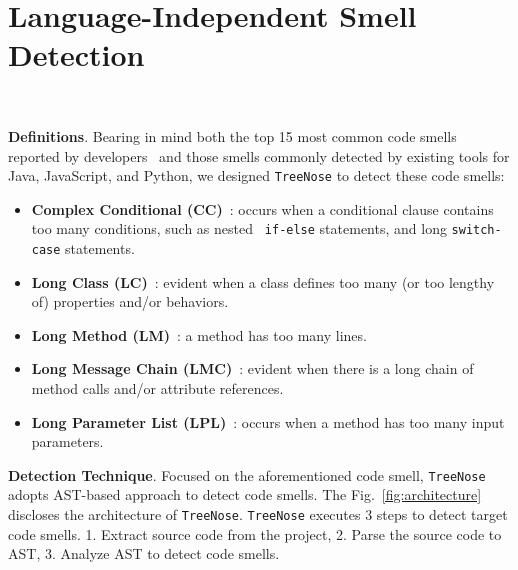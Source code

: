 


\vspace*{-0.5em}

\section{Language-Independent Smell Detection}~\label{sec:approach}

\vspace*{-1em}


{\bf Definitions}. Bearing in mind both the top 15 most common code smells
reported by developers~\cite{developersCare} and those smells commonly detected
by existing tools for Java, JavaScript, and Python, we designed
\texttt{TreeNose} to detect these code smells:

\begin{itemize}[leftmargin=*]
	\item \textbf{Complex Conditional (CC)}~\cite{Fowler_Beck}: occurs when a
	      conditional clause contains too many conditions, such as nested {\tt
			      if-else} statements, and long {\tt switch-case} statements.
	\item \textbf{Long Class (LC)}~\cite{Fowler_Beck}: evident when a class
	      defines too many (or too lengthy of) properties and/or behaviors.
	\item \textbf{Long Method (LM)}~\cite{Fowler_Beck}: a method has too many
	      lines.
	\item \textbf{Long Message Chain (LMC)}~\cite{Fowler_Beck}: evident when
	      there is a long chain of method calls and/or attribute references.
	\item \textbf{Long Parameter List (LPL)}~\cite{Fowler_Beck}: occurs when a
	      method has too many input parameters.
\end{itemize}


{\bf Detection Technique}. Focused on the aforementioned code smell,
\texttt{TreeNose} adopts AST-based approach to detect code smells. The
Fig.~\ref{fig:architecture} discloses the architecture of \texttt{TreeNose}.
\texttt{TreeNose} executes 3 steps to detect target code smells. 1. Extract
source code from the project, 2. Parse the source code to AST, 3. Analyze AST to
detect code smells.


